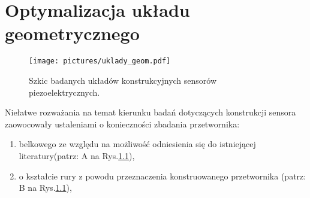 \chapter{Optymalizacja układu geometrycznego}
\label{sec:construction_optymization}
\begin{figure}[htbp]
\centering
\texttt{[image: pictures/uklady\_geom.pdf]}
\caption{Szkic badanych układów konstrukcyjnych sensorów piezoelektrycznych.}
\label{fig:construct_scetch}
\end{figure}
Niełatwe rozważania na temat kierunku badań dotyczących konstrukcji sensora zaowocowały ustaleniami o konieczności zbadania przetwornika:
\begin{enumerate}
\item belkowego ze względu na możliwość odniesienia się do istniejącej literatury(patrz: A na Rys.\ref{fig:construct_scetch}),
\item o kształcie rury z powodu przeznaczenia konstruowanego przetwornika (patrz: B na Rys.\ref{fig:construct_scetch}),
\end{enumerate}